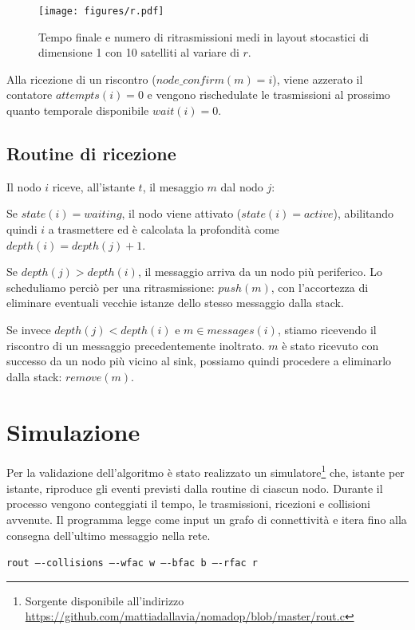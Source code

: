 \documentclass[a4paper,12pt]{article}
\theoremstyle{definition}
\begin{document}
\begin{figure}[H]
\centering
\texttt{[image: figures/r.pdf]}
\caption{Tempo finale e numero di ritrasmissioni medi in layout stocastici di dimensione 1 con 10 satelliti al variare di $r$.}
\end{figure}

Alla ricezione di un riscontro ($node\_confirm(m) = i$), viene azzerato il contatore $attempts(i) = 0$ e vengono rischedulate le trasmissioni al prossimo quanto temporale disponibile $wait(i) = 0$.

\subsection{Routine di ricezione}

Il nodo $i$ riceve, all'istante $t$, il mesaggio $m$ dal nodo $j$:

Se $state(i) = waiting$, il nodo viene attivato ($state(i) = active$), abilitando quindi $i$ a trasmettere ed è calcolata la profondità come $depth(i) = depth(j)+1$.

Se $depth(j) > depth(i)$, il messaggio arriva da un nodo più periferico. Lo scheduliamo perciò per una ritrasmissione: $push(m)$, con l'accortezza di eliminare eventuali vecchie istanze dello stesso messaggio dalla stack.

Se invece $depth(j) < depth(i)$ e $m \in messages(i)$, stiamo ricevendo il riscontro di un messaggio precedentemente inoltrato. $m$ è stato ricevuto con successo da un nodo più vicino al sink, possiamo quindi procedere a eliminarlo dalla stack: $remove(m)$.

\section{Simulazione}
\label{simulazione}


Per la validazione dell'algoritmo è stato realizzato un simulatore\footnote{Sorgente disponibile all'indirizzo \url{https://github.com/mattiadallavia/nomadop/blob/master/rout.c}} che, istante per istante, riproduce gli eventi previsti dalla routine di ciascun nodo. Durante il processo vengono conteggiati il tempo, le trasmissioni, ricezioni e collisioni avvenute. Il programma legge come input un grafo di connettività e itera fino alla consegna dell'ultimo messaggio nella rete.

{\centering
\texttt{rout ----collisions ----wfac w ----bfac b ----rfac r}

}
\end{document}
